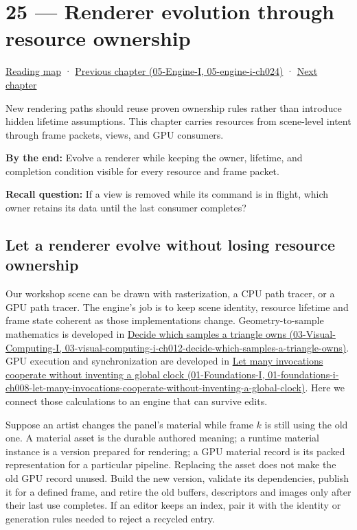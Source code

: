 \hypertarget{06-engine-ii-ch025}{}
\chapter{25 --- Renderer evolution through resource ownership}\label{06-engine-ii-ch025-renderer-evolution-through-resource-ownership}

\hyperref[volume-reading-map]{Reading map} · \href{../05-Engine-I/main.pdf\#nameddest=05-engine-i-ch024}{Previous chapter (05-Engine-I, 05-engine-i-ch024)} · \hyperref[06-engine-ii-ch026]{Next chapter}

New rendering paths should reuse proven ownership rules rather than introduce hidden lifetime assumptions. This chapter carries resources from scene-level intent through frame packets, views, and GPU consumers.

\textbf{By the end:} Evolve a renderer while keeping the owner, lifetime, and completion condition visible for every resource and frame packet.

\textbf{Recall question:} If a view is removed while its command is in flight, which owner retains its data until the last consumer completes?

\section{Let a renderer evolve without losing resource ownership}\label{06-engine-ii-ch025-let-a-renderer-evolve-without-losing-resource-ownership}

Our workshop scene can be drawn with rasterization, a CPU path tracer, or a GPU path tracer. The engine's job is to keep scene identity, resource lifetime and frame state coherent as those implementations change. Geometry-to-sample mathematics is developed in \href{../03-Visual-Computing-I/main.pdf\#nameddest=03-visual-computing-i-ch012-decide-which-samples-a-triangle-owns}{Decide which samples a triangle owns (03-Visual-Computing-I, 03-visual-computing-i-ch012-decide-which-samples-a-triangle-owns)}. GPU execution and synchronization are developed in \href{../01-Foundations-I/main.pdf\#nameddest=01-foundations-i-ch008-let-many-invocations-cooperate-without-inventing-a-global-clock}{Let many invocations cooperate without inventing a global clock (01-Foundations-I, 01-foundations-i-ch008-let-many-invocations-cooperate-without-inventing-a-global-clock)}. Here we connect those calculations to an engine that can survive edits.

Suppose an artist changes the panel's material while frame \(k\) is still using the old one. A material asset is the durable authored meaning; a runtime material instance is a version prepared for rendering; a GPU material record is its packed representation for a particular pipeline. Replacing the asset does not make the old GPU record unused. Build the new version, validate its dependencies, publish it for a defined frame, and retire the old buffers, descriptors and images only after their last use completes. If an editor keeps an index, pair it with the identity or generation rules needed to reject a recycled entry.

